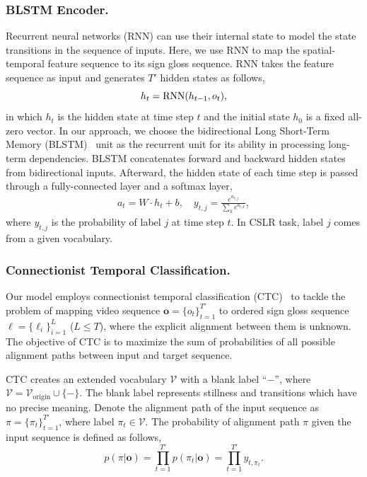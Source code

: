 \documentclass[letterpaper]{article} %
\def\lbf{{\boldsymbol\ell}}
\def\lnf{{\ell}}
\begin{document}
\subsubsection{BLSTM Encoder.}
Recurrent neural networks (RNN) can use their internal state to model the state transitions in the sequence of inputs. Here, we use RNN to map the spatial-temporal feature sequence to its sign gloss sequence. RNN takes the feature sequence as input and generates $T'$ hidden states as follows,
\begin{equation}
    h_t={\rm RNN}(h_{t-1}, o_t),
\end{equation}
in which $h_t$ is the hidden state at time step $t$ and the initial state $h_0$ is a fixed all-zero vector.
In our approach, we choose the bidirectional Long Short-Term Memory (BLSTM)~\cite{LSTM} unit as the recurrent unit for its ability in processing long-term dependencies. BLSTM concatenates forward and backward hidden states from bidirectional inputs. Afterward, the hidden state of each time step is passed through a fully-connected layer and a softmax layer,
\begin{equation}\label{rnn}
    \begin{split}
    a_t = W \cdot h_t+b, \quad
    y_{t,j}=\frac{e^{a_{t,j}}}{\sum_k e^{a_{t,k}}},
    \end{split}
\end{equation}
where $y_{t,j}$ is the probability of label $j$ at time step $t$. In CSLR task, label $j$ comes from a given vocabulary.

\subsubsection{Connectionist Temporal Classification.}
Our model employs connectionist temporal classification (CTC)~\cite{CTC} to tackle the problem of mapping video sequence $\mathbf{o}=\{o_t\}_{t=1}^{T'}$ to ordered sign gloss sequence $\lbf=\{\lnf_i\}_{i=1}^L$ ($L \le T$), where the explicit alignment between them is unknown.
The objective of CTC is to maximize the sum of probabilities of all possible alignment paths between input and target sequence.

CTC creates an extended vocabulary $\mathcal{V}$ with a blank label ``\(-\)'', where $\mathcal{V}=\mathcal{V}_\text{origin} \cup \{-\}$. The blank label represents stillness and transitions which have no precise meaning.
Denote the alignment path of the input sequence as $\pi = \{ \pi_t \}_{t=1}^{T'}$, where label $\pi_t \in \mathcal{V}$. The probability of alignment path $\pi$ given the input sequence is defined as follows,
\begin{equation}
    p(\pi | \mathbf{o}) = \prod_{t=1}^{T'} p(\pi_t | \mathbf{o})= \prod_{t=1}^{T'} y_{t,\pi_t}.
\end{equation}
\end{document}

